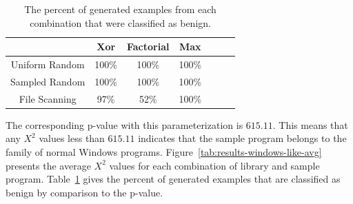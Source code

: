 \documentclass[finalcopy,short]{srpaper}
\begin{document}
        \begin{table}
            \centering
            \begin{tabular}{|c||c|c|c|c|c|c|}
                \hline
                                & Xor & Factorial & Max \\
                \hline
                Uniform Random  & 100\% & 100\% & 100\%\\
                \hline
                Sampled Random  & 100\% & 100\% & 100\%\\
                \hline
                File Scanning   & 97\% & 52\% & 100\% \\
                \hline
            \end{tabular}
            \caption{The percent of generated examples from each combination
                that were classified as benign.}
            \label{tab:results-windows-like-passed}
        \end{table}

        The corresponding p-value with this parameterization is $615.11$. This
        means that any $X^2$ values less than $615.11$ indicates that the sample
        program belongs to the family of normal Windows programs.
        Figure~\ref{tab:results-windows-like-avg} presents the average $X^2$
        values for each combination of library and sample program.
        Table~\ref{tab:results-windows-like-passed} gives the percent of
        generated examples that are classified as benign by comparison to the
        p-value.




     
\end{document}
